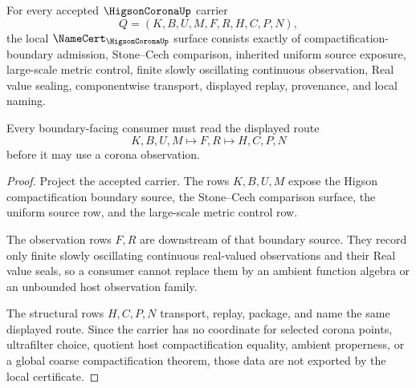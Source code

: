 \begin{theorem}
\label{thm:higson-corona-namecert-obligations}
For every accepted $\HigsonCoronaUp$ carrier
$$
Q=(K,B,U,M,F,R,H,C,P,N),
$$
the local $\NameCert_{\HigsonCoronaUp}$ surface consists exactly of compactification-boundary admission, Stone--Cech comparison, inherited uniform source exposure, large-scale metric control, finite slowly oscillating continuous observation, Real value sealing, componentwise transport, displayed replay, provenance, and local naming.

Every boundary-facing consumer must read the displayed route
$$
K,B,U,M \longmapsto F,R \longmapsto H,C,P,N
$$
before it may use a corona observation.
\end{theorem}
\begin{proof}
Project the accepted carrier. The rows $K,B,U,M$ expose the Higson compactification boundary source, the Stone--Cech comparison surface, the uniform source row, and the large-scale metric control row.

The observation rows $F,R$ are downstream of that boundary source. They record only finite slowly oscillating continuous real-valued observations and their Real value seals, so a consumer cannot replace them by an ambient function algebra or an unbounded host observation family.

The structural rows $H,C,P,N$ transport, replay, package, and name the same displayed route. Since the carrier has no coordinate for selected corona points, ultrafilter choice, quotient host compactification equality, ambient properness, or a global coarse compactification theorem, those data are not exported by the local certificate.
\end{proof}

